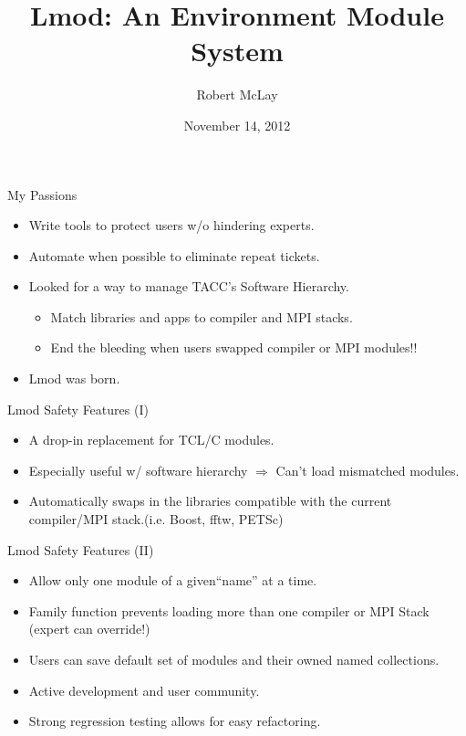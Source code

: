 \documentclass{beamer}
\title{Lmod: An Environment Module System}
\author{Robert McLay}
\institute{The Texas Advanced Computing Center}
\date{November 14, 2012}  %
\begin{document}
\begin{frame}
  \titlepage
\end{frame}

\begin{frame}{My Passions}
  \begin{itemize}
    \item Write tools to protect users w/o hindering experts.
    \item Automate when possible to eliminate repeat tickets.
    \item Looked for a way to manage TACC's Software Hierarchy.
      \begin{itemize}
        \item Match libraries and apps to compiler and MPI stacks.
        \item End the bleeding  when users swapped compiler or MPI modules!!
      \end{itemize}
    \item Lmod was born.
      
  \end{itemize}
\end{frame}

\begin{frame}{Lmod Safety Features (I)}
  \begin{itemize}
    \item A drop-in replacement for TCL/C modules.
    \item Especially useful w/ software hierarchy $\Rightarrow$ Can't
      load mismatched modules.
    \item Automatically swaps in the libraries compatible with the
      current compiler/MPI stack.(i.e. Boost, fftw, PETSc)
  \end{itemize}
\end{frame}

\begin{frame}{Lmod Safety Features (II)}
  \begin{itemize}
    \item Allow only one module of a given``name'' at a time.
    \item Family function prevents loading more than one compiler or
      MPI Stack (expert can override!)
    \item Users can save default set of modules and their owned  named collections.
    \item Active development and user community.
    \item Strong regression testing allows for easy refactoring.
  \end{itemize}
\end{frame}
\end{document}
